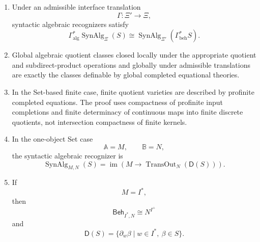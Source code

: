 \begin{theorem}
\begin{enumerate}
\item Under an admissible interface translation
\[
\Gamma:\Xi'\to\Xi,
\]
syntactic algebraic recognizers satisfy
\[
\Gamma_{\mathrm{alg}}^\ast
\operatorname{SynAlg}_{\Xi}(S)
\cong
\operatorname{SynAlg}_{\Xi'}(\Gamma_{\mathrm{beh}}^\ast S).
\]

\item Global algebraic quotient classes closed locally under the appropriate
quotient and subdirect-product operations and globally under admissible
translations are exactly the classes definable by global completed
equational theories.

\item In the Set-based finite case, finite quotient varieties are described
by profinite completed equations. The proof uses compactness of profinite
input completions and finite determinacy of continuous maps into finite
discrete quotients, not intersection compactness of finite kernels.

\item In the one-object Set case
\[
\mathbb A=M,
\qquad
\mathbb B=N,
\]
the syntactic algebraic recognizer is
\[
\operatorname{SynAlg}_{M,N}(S)
=
\operatorname{im}
\left(
M\to
\operatorname{TransOut}_N(\mathsf D(S))
\right).
\]

\item If
\[
M=I^\ast,
\]
then
\[
\mathsf{Beh}_{I^\ast,N}\cong N^{I^+}
\]
and
\[
\mathsf D(S)
=
\{\partial_w\beta\mid w\in I^\ast,\ \beta\in S\}.
\]
\end{enumerate}
\end{theorem}

